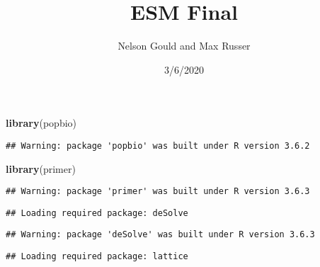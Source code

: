 \documentclass[]{article}
\title{ESM Final}
\author{Nelson Gould and Max Russer}
\date{3/6/2020}
\newenvironment{Shaded}{\begin{snugshade}}{\end{snugshade}}
\newcommand{\KeywordTok}[1]{\textcolor[rgb]{0.13,0.29,0.53}{\textbf{#1}}}
\newcommand{\NormalTok}[1]{#1}
\begin{document}
\maketitle

\begin{Shaded}
\begin{Highlighting}[]
\KeywordTok{library}\NormalTok{(popbio)}
\end{Highlighting}
\end{Shaded}

\begin{verbatim}
## Warning: package 'popbio' was built under R version 3.6.2
\end{verbatim}

\begin{Shaded}
\begin{Highlighting}[]
\KeywordTok{library}\NormalTok{(primer)}
\end{Highlighting}
\end{Shaded}

\begin{verbatim}
## Warning: package 'primer' was built under R version 3.6.3
\end{verbatim}

\begin{verbatim}
## Loading required package: deSolve
\end{verbatim}

\begin{verbatim}
## Warning: package 'deSolve' was built under R version 3.6.3
\end{verbatim}

\begin{verbatim}
## Loading required package: lattice
\end{verbatim}
\end{document}
